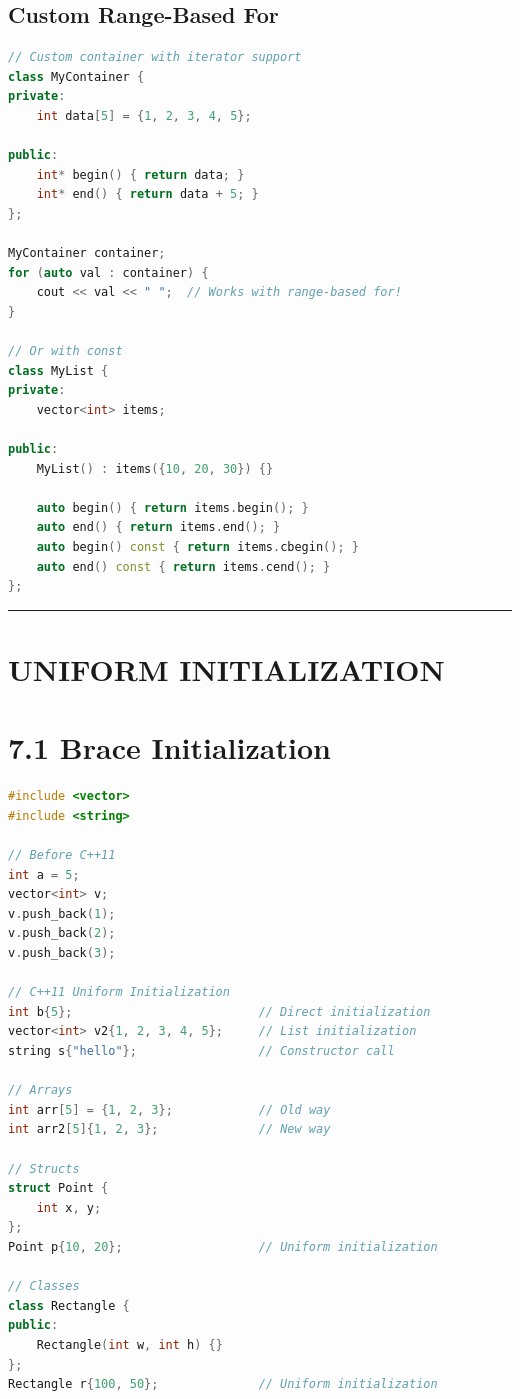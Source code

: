 \hypertarget{custom-range-based-for}{%
\subsection{Custom Range-Based For}\label{custom-range-based-for}}

\begin{lstlisting}[language={C++}]
// Custom container with iterator support
class MyContainer {
private:
    int data[5] = {1, 2, 3, 4, 5};

public:
    int* begin() { return data; }
    int* end() { return data + 5; }
};

MyContainer container;
for (auto val : container) {
    cout << val << " ";  // Works with range-based for!
}

// Or with const
class MyList {
private:
    vector<int> items;

public:
    MyList() : items({10, 20, 30}) {}
    
    auto begin() { return items.begin(); }
    auto end() { return items.end(); }
    auto begin() const { return items.cbegin(); }
    auto end() const { return items.cend(); }
};
\end{lstlisting}

\begin{center}\rule{0.5\linewidth}{0.5pt}\end{center}

\hypertarget{uniform-initialization}{%
\section{UNIFORM INITIALIZATION}\label{uniform-initialization}}

\hypertarget{brace-initialization}{%
\section{7.1 Brace Initialization}\label{brace-initialization}}

\begin{lstlisting}[language={C++}]
#include <vector>
#include <string>

// Before C++11
int a = 5;
vector<int> v;
v.push_back(1);
v.push_back(2);
v.push_back(3);

// C++11 Uniform Initialization
int b{5};                          // Direct initialization
vector<int> v2{1, 2, 3, 4, 5};     // List initialization
string s{"hello"};                 // Constructor call

// Arrays
int arr[5] = {1, 2, 3};            // Old way
int arr2[5]{1, 2, 3};              // New way

// Structs
struct Point {
    int x, y;
};
Point p{10, 20};                   // Uniform initialization

// Classes
class Rectangle {
public:
    Rectangle(int w, int h) {}
};
Rectangle r{100, 50};              // Uniform initialization
\end{lstlisting}

